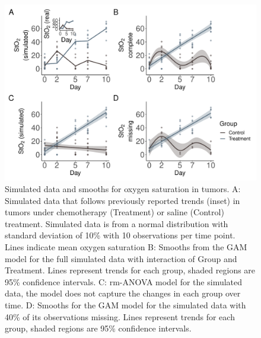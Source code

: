 \documentclass[
]{article}
\begin{document}
\begin{figure}[H]

{\centering \includegraphics[width=0.75\linewidth,]{Full_document_files/figure-latex/sim-smooth-plot-Appendix-1} 

}

\caption{Simulated data and smooths for oxygen saturation in tumors. A: Simulated data that follows previously reported trends (inset) in tumors under chemotherapy (Treatment) or saline (Control) treatment. Simulated data is from a normal distribution with standard deviation of 10\% with 10 observations per time point. Lines indicate mean oxygen saturation B: Smooths from the GAM model for the full simulated data with interaction of Group and Treatment. Lines represent trends for each group, shaded regions are 95\% confidence intervals. C: rm-ANOVA model for the simulated data, the model does not capture the changes in each group over time. D: Smooths for the GAM model for the simulated data with 40\% of its observations missing. Lines represent trends for each group, shaded regions are 95\% confidence intervals.}\label{fig:sim-smooth-plot-Appendix}
\end{figure}
\end{document}
